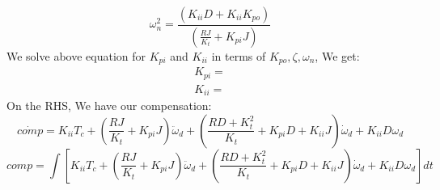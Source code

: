 \documentclass[12pt,a4paper]{article}
\begin{document}
	\[
	\omega_n^2 = \frac{(K_{ii}D+K_{ii}K_{po})}{(\frac{RJ}{K_t} + K_{pi}J )}
	\]
	We solve above equation for $ K_{pi} $ and $ K_{ii} $ in terms of $ K_{po},\zeta,\omega_n $, We get:
	\[
	\begin{split}
		K_{pi} = \\
		K_{ii} = 
	\end{split}
	\]
	On the RHS, We have our compensation:
	\[
	\dot{comp} = K_{ii}T_c +(\frac{RJ}{K_t} + K_{pi}J ) \ddot{\omega}_d + (\frac{RD + K_t^2}{K_t}+ K_{pi}D + K_{ii}J) \dot{\omega}_d+K_{ii}D\omega_d
	\]
	\[
	comp = \int \left[ K_{ii}T_c +(\frac{RJ}{K_t} + K_{pi}J ) \ddot{\omega}_d + (\frac{RD + K_t^2}{K_t}+ K_{pi}D + K_{ii}J) \dot{\omega}_d+K_{ii}D\omega_d\right] dt
	\]
	
\end{document}
